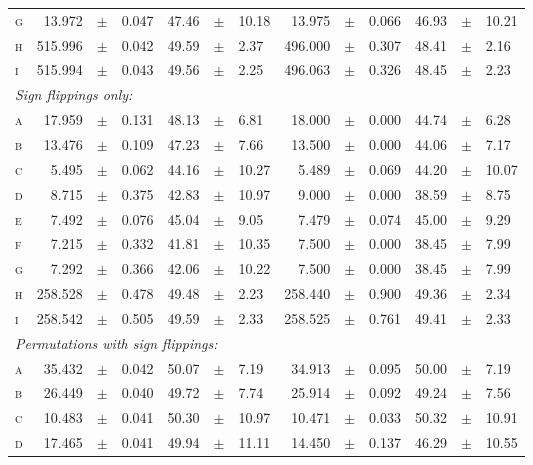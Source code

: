 \begin{table}[tp]
\begin{center}
{\begin{tabular}{@{}lr@{\hspace{3pt}}c@{\hspace{3pt}}lr@{\hspace{3pt}}c@{\hspace{3pt}}lr@{\hspace{3pt}}c@{\hspace{3pt}}lr@{\hspace{3pt}}c@{\hspace{3pt}}l@{}}
\textsc{g} & 13.972 & $\pm$ & 0.047 & 47.46 & $\pm$ & 10.18 & 13.975 & $\pm$ & 0.066 & 46.93 & $\pm$ & 10.21 \\
\textsc{h} & 515.996 & $\pm$ & 0.042 & 49.59 & $\pm$ & 2.37 & 496.000 & $\pm$ & 0.307 & 48.41 & $\pm$ & 2.16 \\
\textsc{i} & 515.994 & $\pm$ & 0.043 & 49.56 & $\pm$ & 2.25 & 496.063 & $\pm$ & 0.326 & 48.45 & $\pm$ & 2.23 \\
\midrule
\multicolumn{13}{l}{\emph{Sign flippings only:}}\\
\textsc{a} & 17.959 & $\pm$ & 0.131 & 48.13 & $\pm$ & 6.81 & 18.000 & $\pm$ & 0.000 & 44.74 & $\pm$ & 6.28\\
\textsc{b} & 13.476 & $\pm$ & 0.109 & 47.23 & $\pm$ & 7.66 & 13.500 & $\pm$ & 0.000 & 44.06 & $\pm$ & 7.17\\
\textsc{c} & 5.495 & $\pm$ & 0.062 & 44.16 & $\pm$ & 10.27 & 5.489 & $\pm$ & 0.069 & 44.20 & $\pm$ & 10.07\\
\textsc{d} & 8.715 & $\pm$ & 0.375 & 42.83 & $\pm$ & 10.97 & 9.000 & $\pm$ & 0.000 & 38.59 & $\pm$ & 8.75\\
\textsc{e} & 7.492 & $\pm$ & 0.076 & 45.04 & $\pm$ & 9.05 & 7.479 & $\pm$ & 0.074 & 45.00 & $\pm$ & 9.29\\
\textsc{f} & 7.215 & $\pm$ & 0.332 & 41.81 & $\pm$ & 10.35 & 7.500 & $\pm$ & 0.000 & 38.45 & $\pm$ & 7.99\\
\textsc{g} & 7.292 & $\pm$ & 0.366 & 42.06 & $\pm$ & 10.22 & 7.500 & $\pm$ & 0.000 & 38.45 & $\pm$ & 7.99\\
\textsc{h} & 258.528 & $\pm$ & 0.478 & 49.48 & $\pm$ & 2.23 & 258.440 & $\pm$ & 0.900 & 49.36 & $\pm$ & 2.34\\
\textsc{i} & 258.542 & $\pm$ & 0.505 & 49.59 & $\pm$ & 2.33 & 258.525 & $\pm$ & 0.761 & 49.41 & $\pm$ & 2.33\\
\midrule
\multicolumn{13}{l}{\emph{Permutations with sign flippings:}}\\
\textsc{a} & 35.432 & $\pm$ & 0.042 & 50.07 & $\pm$ & 7.19 & 34.913 & $\pm$ & 0.095 & 50.00 & $\pm$ & 7.19\\
\textsc{b} & 26.449 & $\pm$ & 0.040 & 49.72 & $\pm$ & 7.74 & 25.914 & $\pm$ & 0.092 & 49.24 & $\pm$ & 7.56\\
\textsc{c} & 10.483 & $\pm$ & 0.041 & 50.30 & $\pm$ & 10.97 & 10.471 & $\pm$ & 0.033 & 50.32 & $\pm$ & 10.91\\
\textsc{d} & 17.465 & $\pm$ & 0.041 & 49.94 & $\pm$ & 11.11 & 14.450 & $\pm$ & 0.137 & 46.29 & $\pm$ & 10.55\\

\end{tabular}}
\end{center}
\end{table}
